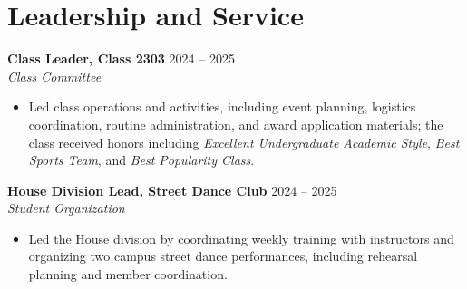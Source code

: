 \documentclass[10pt,a4paper]{article}
\newcommand{\entry}[4]{%
  \textbf{#1} \hfill #2\\
  \textit{#3} \hfill \textit{#4}\\[-0.35em]
}
\newcommand{\cvitem}[1]{\item \small #1}
\begin{document}
\section*{Leadership and Service}

\entry{Class Leader, Class 2303}{2024 -- 2025}{Class Committee}{}
\begin{itemize}[leftmargin=1.2em, topsep=0.2em, itemsep=0.18em]
  \cvitem{Led class operations and activities, including event planning, logistics coordination, routine administration, and award application materials; the class received honors including \textit{Excellent Undergraduate Academic Style}, \textit{Best Sports Team}, and \textit{Best Popularity Class}.}
\end{itemize}

\entry{House Division Lead, Street Dance Club}{2024 -- 2025}{Student Organization}{}
\begin{itemize}[leftmargin=1.2em, topsep=0.2em, itemsep=0.18em]
  \cvitem{Led the House division by coordinating weekly training with instructors and organizing two campus street dance performances, including rehearsal planning and member coordination.}
\end{itemize}



\vspace{0.6em}
\end{document}
